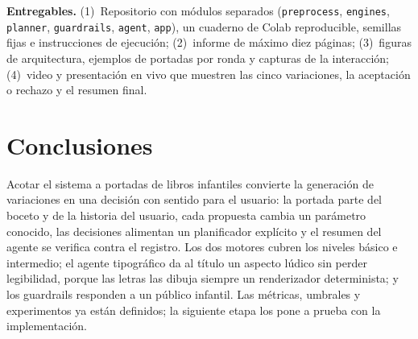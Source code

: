 \documentclass[10pt,a4paper,twocolumn]{article}
\begin{document}
\textbf{Entregables.} (1)~Repositorio con módulos separados (\texttt{preprocess}, \texttt{engines}, \texttt{planner}, \texttt{guardrails}, \texttt{agent}, \texttt{app}), un cuaderno de Colab reproducible, semillas fijas e instrucciones de ejecución; (2)~informe de máximo diez páginas; (3)~figuras de arquitectura, ejemplos de portadas por ronda y capturas de la interacción; (4)~video y presentación en vivo que muestren las cinco variaciones, la aceptación o rechazo y el resumen final.

\section{Conclusiones}
Acotar el sistema a portadas de libros infantiles convierte la generación de variaciones en una decisión con sentido para el usuario: la portada parte del boceto y de la historia del usuario, cada propuesta cambia un parámetro conocido, las decisiones alimentan un planificador explícito y el resumen del agente se verifica contra el registro. Los dos motores cubren los niveles básico e intermedio; el agente tipográfico da al título un aspecto lúdico sin perder legibilidad, porque las letras las dibuja siempre un renderizador determinista; y los guardrails responden a un público infantil. Las métricas, umbrales y experimentos ya están definidos; la siguiente etapa los pone a prueba con la implementación.

{\scriptsize

}
\end{document}
